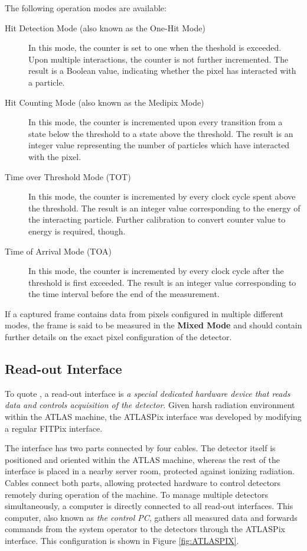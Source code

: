The following operation modes are available:

\begin{description}
	\item[Hit Detection Mode (also known as the One-Hit Mode)]
	In this mode, the counter is set to one when the theshold is exceeded. Upon multiple interactions, the counter is not further incremented. The result is a Boolean value, indicating whether the pixel has interacted with a particle.

	\item[Hit Counting Mode (also known as the Medipix Mode)]
	In this mode, the counter is incremented upon every transition from a state below the threshold to a state above the threshold. The result is an integer value representing the number of particles which have interacted with the pixel.

	\item[Time over Threshold Mode (TOT)]\label{tpx:tot}
	In this mode, the counter is incremented by every clock cycle spent above the threshold. The result is an integer value corresponding to the energy of the interacting particle. Further calibration to convert counter value to energy is required, though.

	\item[Time of Arrival Mode (TOA)]\label{tpx:toa}
	In this mode, the counter is incremented by every clock cycle after the threshold is first exceeded. The result is an integer value corresponding to the time interval before the end of the measurement.
\end{description}

If a captured frame contains data from pixels configured in multiple different modes, the frame is said to be measured in the \textbf{Mixed Mode} and should contain further details on the exact pixel configuration of the detector.


\subsection{Read-out Interface}
To quote \cite{TurecekThesis2011}, a read-out interface is \textit{a special dedicated hardware device that reads data and controls acquisition of the detector}. Given harsh radiation environment within the ATLAS machine, the ATLASPix interface was developed by modifying a regular FITPix interface.


The interface has two parts connected by four cables. The detector itself is positioned and oriented within the ATLAS machine, whereas the rest of the interface is placed in a nearby server room, protected against ionizing radiation. Cables connect both parts, allowing protected hardware to control detectors remotely during operation of the machine. To manage multiple detectors simultaneously, a computer is directly connected to all read-out interfaces. This computer, also known as \textit{the control PC}, gathers all measured data and forwards commands from the system operator to the detectors through the ATLASPix interface. This configuration is shown in Figure \ref{fig:ATLASPIX}.

